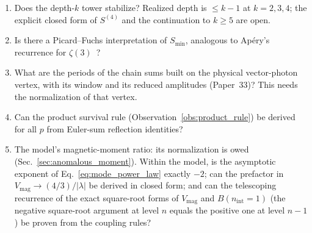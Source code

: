 \documentclass[11pt]{article}
\begin{document}
\begin{enumerate}
\item Does the depth-$k$ tower stabilize?  Realized depth is $\le k-1$
      at $k = 2, 3, 4$; the explicit closed form of $S^{(4)}$ and the
      continuation to $k \ge 5$ are open.
\item Is there a Picard--Fuchs interpretation of $S_{\min}$, analogous
      to Ap\'ery's recurrence for $\zeta(3)$~\cite{apery1979}?
\item What are the periods of the chain sums built on the physical
      vector-photon vertex, with its window and its reduced amplitudes
      (Paper~33)?  This needs the normalization of that vertex.
\item Can the product survival rule (Observation~\ref{obs:product_rule})
      be derived for all $p$ from Euler-sum reflection identities?
\item The model's magnetic-moment ratio: its normalization is owed
      (Sec.~\ref{sec:anomalous_moment}).  Within the model, is the
      asymptotic exponent of Eq.~\eqref{eq:mode_power_law} exactly
      $-2$; can the prefactor in $V_{\mathrm{mag}} \to (4/3)/|\lambda|$
      be derived in closed form; and can the telescoping recurrence of
      the exact square-root forms of $V_{\mathrm{mag}}$ and
      $B(n_{\mathrm{int}} = 1)$ (the negative square-root argument at
      level $n$ equals the positive one at level $n - 1$) be proven
      from the coupling rules?
\end{enumerate}

\end{document}
